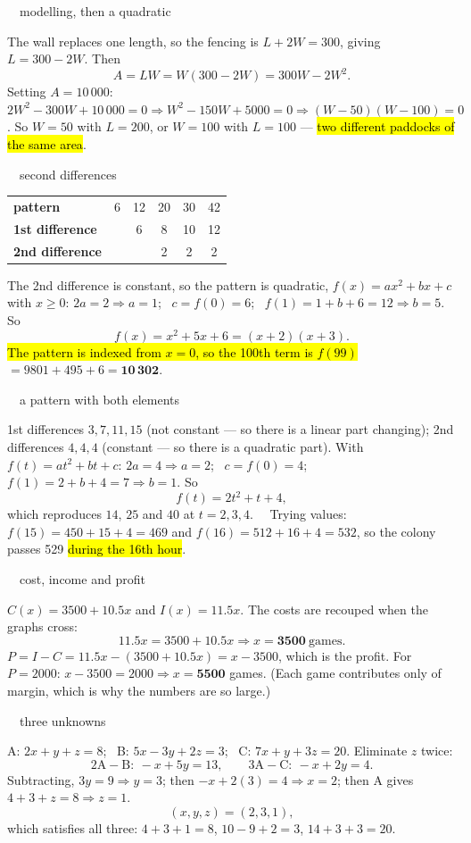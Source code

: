 \documentclass[11pt]{article}
\newcommand{\key}[1]{\hl{#1}}
\newcommand{\solhead}[2]{\medskip{\color{lilacdeep}\bfseries Q#1.}\ \ {\color{greyish}\footnotesize #2}\par\nobreak}
\begin{document}
\solhead{24}{modelling, then a quadratic}
The wall replaces one length, so the fencing is $L+2W=300$, giving $L=300-2W$. Then
\[A=LW=W(300-2W)=300W-2W^{2}.\]
Setting $A=10\,000$: $2W^{2}-300W+10\,000=0\Rightarrow W^{2}-150W+5000=0\Rightarrow(W-50)(W-100)=0$.
So $W=50$ with $L=200$, or $W=100$ with $L=100$ --- \key{two different paddocks of the same area}.

\solhead{25}{second differences}
\vspace{-0.5em}
\begin{center}
\begin{tabular}{@{}l|ccccc@{}}
\textbf{pattern} & 6 & 12 & 20 & 30 & 42\\
\textbf{1st difference} & & 6 & 8 & 10 & 12\\
\textbf{2nd difference} & & & 2 & 2 & 2\\
\end{tabular}
\end{center}
\vspace{-0.3em}
The 2nd difference is constant, so the pattern is quadratic, $f(x)=ax^{2}+bx+c$ with $x\ge0$:
$2a=2\Rightarrow a=1$; \ $c=f(0)=6$; \ $f(1)=1+b+6=12\Rightarrow b=5$. So
\[f(x)=x^{2}+5x+6=(x+2)(x+3).\]
\key{The pattern is indexed from \mbox{$x=0$}, so the 100th term is \mbox{$f(99)$}}$=9801+495+6=\mathbf{10\,302}$.

\solhead{26}{a pattern with both elements}
1st differences $3,7,11,15$ (not constant --- so there is a linear part changing); 2nd differences $4,4,4$ (constant --- so there is a quadratic part). With $f(t)=at^{2}+bt+c$:
$2a=4\Rightarrow a=2$; \ $c=f(0)=4$; \ $f(1)=2+b+4=7\Rightarrow b=1$. So
\[f(t)=2t^{2}+t+4,\]
which reproduces $14$, $25$ and $40$ at $t=2,3,4$. \checkmark\ \ Trying values: $f(15)=450+15+4=469$ and $f(16)=512+16+4=532$, so the colony passes 529 \key{during the 16th hour}.

\solhead{27}{cost, income and profit}
$C(x)=3500+10.5x$ and $I(x)=11.5x$. The costs are recouped when the graphs cross:
\[11.5x=3500+10.5x\Rightarrow x=\mathbf{3500}\ \text{games}.\]
$P=I-C=11.5x-(3500+10.5x)=x-3500$, which is the profit. For $P=2000$: $x-3500=2000\Rightarrow x=\mathbf{5500}$ games.
(Each game contributes only  of margin, which is why the numbers are so large.)

\solhead{28}{three unknowns}
A: $2x+y+z=8$; \ B: $5x-3y+2z=3$; \ C: $7x+y+3z=20$. Eliminate $z$ twice:
\[2\text{A}-\text{B}:\ -x+5y=13,\qquad 3\text{A}-\text{C}:\ -x+2y=4.\]
Subtracting, $3y=9\Rightarrow y=3$; then $-x+2(3)=4\Rightarrow x=2$; then A gives $4+3+z=8\Rightarrow z=1$.
\[(x,y,z)=(2,3,1),\]
which satisfies all three: $4+3+1=8$, $10-9+2=3$, $14+3+3=20$.\ \checkmark
\end{document}
